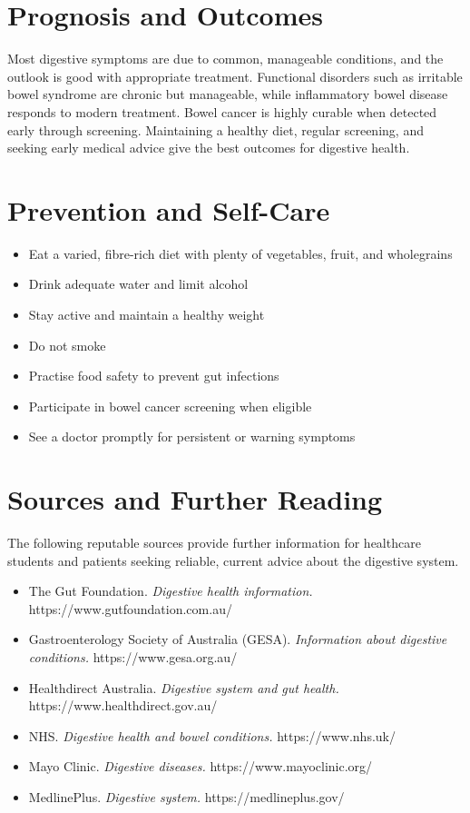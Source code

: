 \section*{Prognosis and Outcomes}
Most digestive symptoms are due to common, manageable conditions, and the outlook is good with appropriate treatment. Functional disorders such as irritable bowel syndrome are chronic but manageable, while inflammatory bowel disease responds to modern treatment. Bowel cancer is highly curable when detected early through screening. Maintaining a healthy diet, regular screening, and seeking early medical advice give the best outcomes for digestive health.

\section*{Prevention and Self-Care}
\begin{itemize}
    \item Eat a varied, fibre-rich diet with plenty of vegetables, fruit, and wholegrains
    \item Drink adequate water and limit alcohol
    \item Stay active and maintain a healthy weight
    \item Do not smoke
    \item Practise food safety to prevent gut infections
    \item Participate in bowel cancer screening when eligible
    \item See a doctor promptly for persistent or warning symptoms
\end{itemize}

\section*{Sources and Further Reading}
The following reputable sources provide further information for healthcare students and patients seeking reliable, current advice about the digestive system.

\begin{itemize}
    \item The Gut Foundation. \textit{Digestive health information.} https://www.gutfoundation.com.au/
    \item Gastroenterology Society of Australia (GESA). \textit{Information about digestive conditions.} https://www.gesa.org.au/
    \item Healthdirect Australia. \textit{Digestive system and gut health.} https://www.healthdirect.gov.au/
    \item NHS. \textit{Digestive health and bowel conditions.} https://www.nhs.uk/
    \item Mayo Clinic. \textit{Digestive diseases.} https://www.mayoclinic.org/
    \item MedlinePlus. \textit{Digestive system.} https://medlineplus.gov/
\end{itemize}
